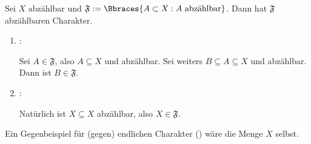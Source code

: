 \begin{solution}
\begin{enumerate}[label = \arabic*.]
  Sei $X$ abzählbar und $\mathfrak{F} := \Bbraces{A \subset X: A ~\text{abzählbar}}$.
  Dann hat $\mathfrak{F}$ abzählbaren Charakter.

  \begin{enumerate}[label = \texttt{ad}]

    \item \Quote{$\to$}:

    Sei $A \in \mathfrak{F}$, also $A \subseteq X$ und abzählbar.
    Sei weiters $B \subseteq A \subseteq X$ und abzählbar.
    Dann ist $B \in \mathfrak{F}$.

    \item \Quote{$\leftarrow$}:

    Natürlich ist $X \subseteq X$ abzählbar, also $X \in \mathfrak{F}$.

  \end{enumerate}

  Ein Gegenbeispiel für (gegen) endlichen Charakter (\Quote{$\not \leftarrow$}) wäre die Menge $X$ selbst.

\end{enumerate}

\end{solution}

